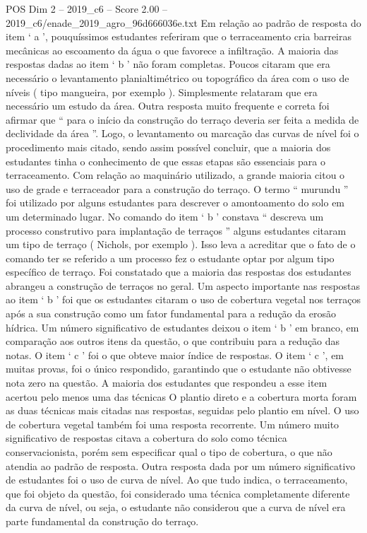\begin{textsample}{POS Dim 2 – 2019\_c6 – Score 2.00 – 2019\_c6/enade\_2019\_agro\_96d666036e.txt}
Em relação ao padrão de resposta do item ‘ a ’, pouquíssimos estudantes referiram que o terraceamento cria barreiras mecânicas ao escoamento da água o que favorece a infiltração.
A maioria das respostas dadas ao item ‘ b ’ não foram completas.
Poucos citaram que era necessário o levantamento planialtimétrico ou topográfico da área com o uso de níveis ( tipo mangueira, por exemplo ).
Simplesmente relataram que era necessário um estudo da área.
Outra resposta muito frequente e correta foi afirmar que “ para o início da construção do terraço deveria ser feita a medida de declividade da área ”.
Logo, o levantamento ou marcação das curvas de nível foi o procedimento mais citado, sendo assim possível concluir, que a maioria dos estudantes tinha o conhecimento de que essas etapas são essenciais para o terraceamento.
Com relação ao maquinário utilizado, a grande maioria citou o uso de grade e terraceador para a construção do terraço.
O termo “ murundu ” foi utilizado por alguns estudantes para descrever o amontoamento do solo em um determinado lugar.
No comando do item ‘ b ’ constava “ descreva um processo construtivo para implantação de terraços ” alguns estudantes citaram um tipo de terraço ( Nichols, por exemplo ).
Isso leva a acreditar que o fato de o comando ter se referido a um processo fez o estudante optar por algum tipo específico de terraço.
Foi constatado que a maioria das respostas dos estudantes abrangeu a construção de terraços no geral.
Um aspecto importante nas respostas ao item ‘ b ’ foi que os estudantes citaram o uso de cobertura vegetal nos terraços após a sua construção como um fator fundamental para a redução da erosão hídrica.
Um número significativo de estudantes deixou o item ‘ b ’ em branco, em comparação aos outros itens da questão, o que contribuiu para a redução das notas.
O item ‘ c ’ foi o que obteve maior índice de respostas.
O item ‘ c ’, em muitas provas, foi o único respondido, garantindo que o estudante não obtivesse nota zero na questão.
A maioria dos estudantes que respondeu a esse item acertou pelo menos uma das técnicas O plantio direto e a cobertura morta foram as duas técnicas mais citadas nas respostas, seguidas pelo plantio em nível.
O uso de cobertura vegetal também foi uma resposta recorrente.
Um número muito significativo de respostas citava a cobertura do solo como técnica conservacionista, porém sem especificar qual o tipo de cobertura, o que não atendia ao padrão de resposta.
Outra resposta dada por um número significativo de estudantes foi o uso de curva de nível.
Ao que tudo indica, o terraceamento, que foi objeto da questão, foi considerado uma técnica completamente diferente da curva de nível, ou seja, o estudante não considerou que a curva de nível era parte fundamental da construção do terraço.

\end{textsample}
